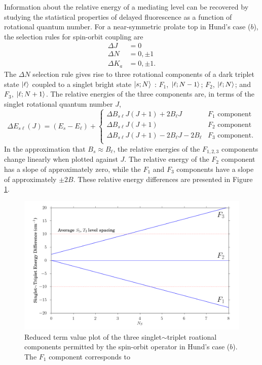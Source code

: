 \documentclass[12pt,draft]{mitthesis}
\begin{document}
Information about the relative energy of a mediating level can be
recovered by studying the statistical properties of delayed
fluorescence as a function of rotational quantum number.  For a
near-symmetric prolate top in Hund's case ($b$), the selection rules
for spin-orbit coupling are \cite{stevens73}
\begin{equation}
  \begin{split}
    \Delta J &= 0 \\
    \Delta N &= 0, \pm 1\\
    \Delta K_a &= 0, \pm 1.
  \end{split}
\end{equation}
The $\Delta N$ selection rule gives rise to three rotational
components of a dark triplet state $\mathinner{|{\ell}\rangle}$ coupled to a singlet
bright state $\mathinner{|{s;N}\rangle}$ : $F_1$, $\mathinner{|{\ell;N-1}\rangle}$; $F_2$,
$\mathinner{|{\ell;N}\rangle}$; and $F_3$, $\mathinner{|{\ell;N+1}\rangle}$.  The relative energies of
the three components are, in terms of the singlet rotational quantum
number $J$,
\begin{equation}
  \label{eq:components}
  \Delta E_{s\ell}(J) = (E_{s} - E_{\ell}) +
  \begin{cases}
    \Delta B_{s\ell}J(J+1) + 2B_{\ell}J           
    & F_1 \text{ component}\\
    \Delta B_{s\ell}J(J+1)                      
    & F_2 \text{ component}\\
    \Delta B_{s\ell}J(J+1) - 2B_{\ell}J - 2B_{\ell} 
    & F_3 \text{ component}.\\
  \end{cases}
\end{equation}
In the approximation that $B_s \approx B_{\ell}$, the relative
energies of the $F_{1,2,3}$ components change linearly when plotted
against $J$.  The relative energy of the $F_2$ component has a slope
of approximately zero, while the $F_1$ and $F_3$ components have a
slope of approximately $\pm2B$.  These relative energy differences are
presented in Figure \ref{fig:components}.

\begin{figure}
  \caption{ Reduced term value plot of the three singlet$\sim$triplet
    roational components permitted by the spin-orbit operator in
    Hund's case ($b$).  The $F_1$ component corresponds to  }
  \label{fig:components}
  \centering
  \includegraphics[width=6in]{f-components.png}
\end{figure}
\end{document}
